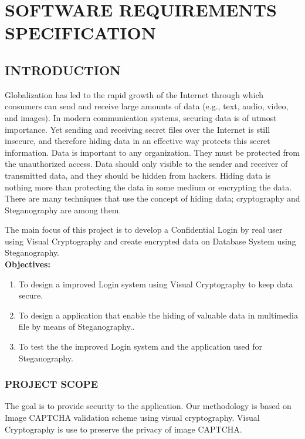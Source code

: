 \documentclass[12pt]{extreport}
\begin{document}

\chapter{SOFTWARE REQUIREMENTS SPECIFICATION}

\section{INTRODUCTION}
\hspace*{5em}Globalization has led to the rapid growth of the Internet through which consumers can send and receive large amounts of data (e.g., text, audio, video, and images). In modern communication systems, securing data is of utmost importance. Yet sending and receiving secret files over the Internet is still insecure, and therefore hiding data in an effective way protects this secret information.
Data is important to any organization. They must be protected from the unauthorized access. Data should only visible to the sender and receiver of transmitted data, and they should be hidden from hackers. Hiding data is nothing more than protecting the data in some medium or encrypting the data. There are many techniques that use the concept of hiding data; cryptography and Steganography are among them. 

The main focus of this project is to develop a Confidential Login by real user using Visual Cryptography and create encrypted data on Database System using Steganography.\\
\noindent
\textbf{Objectives:}
\begin{enumerate}
\item To design  a improved Login system using Visual Cryptography to keep data secure.
\item To design  a application  that enable the hiding of valuable data in multimedia file by means of Steganography..
\item To test the the improved Login system and the application used for Steganography. 
\end{enumerate}
     \subsection{PROJECT SCOPE}
\hspace*{5em}The goal is to provide security  to  the application. Our  methodology  is  based  on  Image  CAPTCHA validation scheme using visual cryptography.  Visual Cryptography is use to preserve the privacy of image CAPTCHA.
\end{document}
